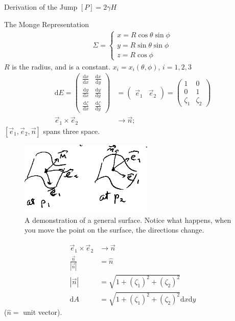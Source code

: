 \documentclass{article}
\renewcommand{\d}[0]{\mathrm{d}}
\newcommand{\dOne}[2]{\frac{\d #1}{\d #2}}
\begin{document}
\begin{section}{Derivation of the Jump $[P] = 2\gamma H$}
\begin{subsection}{The Monge Representation}
  \begin{align*}
    \Sigma  = \begin{cases} x = R\cos{\theta}\sin\phi\\
      y = R\sin\theta\sin\phi\\
    z = R\cos\phi\end{cases}
  \end{align*}
  $R$ is the radius, and is a constant. $x_i = x_i(\theta,\phi)$, $i=1,2,3$
  \begin{align*}
    \d E = \begin{pmatrix}
      \dOne{x}{x} & \dOne{x}{y}\\[6pt]
      \dOne{y}{x} & \dOne{y}{y}\\[6pt]
      \dOne{\zeta}{x} & \dOne{\zeta}{y}
  	\end{pmatrix}
      &=\begin{pmatrix}\vec{e}_1 & \vec{e}_2\end{pmatrix}
	= \begin{pmatrix}
      1 & 0\\
      0 & 1\\
      \zeta_1 & \zeta_2
  	\end{pmatrix}\\
    \vec{e}_1 \times \vec{e}_2 &\rightarrow \vec{n};   
	\end{align*}
    $[\vec{e}_1,\vec{e}_2,\vec{n}]$
spans three space.
\begin{figure}[h]
	\centering
	\includegraphics[height=100pt]{p1p2}
	\caption{A demonstration of a general surface. Notice what happens, when you move the point on the surface, the directions change.}
	\label{fig:p1p2}
\end{figure}
  \begin{align*}
    \vec{e}_1 \times \vec{e}_2 &\rightarrow \vec{n}\\
    \frac{\vec{n}}{|\vec{n}|} &= \hat{n}\\ 
    |\vec{n}| &= \sqrt{1  + (\zeta_1)^2 + (\zeta_2)^2}\\
    \d A &= \sqrt{1  + (\zeta_1)^2 + (\zeta_2)^2} \d x \d y 
\end{align*}
 ($\hat{n} = $ unit vector).
  

\end{subsection}
\end{section}
\end{document}
